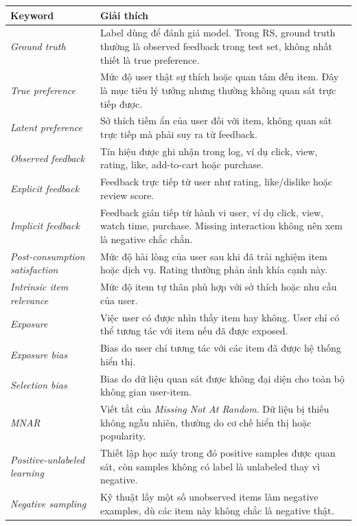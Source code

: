 \documentclass[12pt,a4paper]{article}
\begin{document}
\begin{table}[h!]
\centering
\small
\begin{tabular}{p{4cm} p{9cm}}
\toprule
\textbf{Keyword} & \textbf{Giải thích} \\
\midrule
\textit{Ground truth} & Label dùng để đánh giá model. Trong RS, ground truth thường là observed feedback trong test set, không nhất thiết là true preference. \\
\textit{True preference} & Mức độ user thật sự thích hoặc quan tâm đến item. Đây là mục tiêu lý tưởng nhưng thường không quan sát trực tiếp được. \\
\textit{Latent preference} & Sở thích tiềm ẩn của user đối với item, không quan sát trực tiếp mà phải suy ra từ feedback. \\
\textit{Observed feedback} & Tín hiệu được ghi nhận trong log, ví dụ click, view, rating, like, add-to-cart hoặc purchase. \\
\textit{Explicit feedback} & Feedback trực tiếp từ user như rating, like/dislike hoặc review score. \\
\textit{Implicit feedback} & Feedback gián tiếp từ hành vi user, ví dụ click, view, watch time, purchase. Missing interaction không nên xem là negative chắc chắn. \\
\textit{Post-consumption satisfaction} & Mức độ hài lòng của user sau khi đã trải nghiệm item hoặc dịch vụ. Rating thường phản ánh khía cạnh này. \\
\textit{Intrinsic item relevance} & Mức độ item tự thân phù hợp với sở thích hoặc nhu cầu của user. \\
\textit{Exposure} & Việc user có được nhìn thấy item hay không. User chỉ có thể tương tác với item nếu đã được exposed. \\
\textit{Exposure bias} & Bias do user chỉ tương tác với các item đã được hệ thống hiển thị. \\
\textit{Selection bias} & Bias do dữ liệu quan sát được không đại diện cho toàn bộ không gian user-item. \\
\textit{MNAR} & Viết tắt của \textit{Missing Not At Random}. Dữ liệu bị thiếu không ngẫu nhiên, thường do cơ chế hiển thị hoặc popularity. \\
\textit{Positive-unlabeled learning} & Thiết lập học máy trong đó positive samples được quan sát, còn samples không có label là unlabeled thay vì negative. \\
\textit{Negative sampling} & Kỹ thuật lấy một số unobserved items làm negative examples, dù các item này không chắc là negative thật. \\

\end{tabular}
\end{table}
\end{document}
